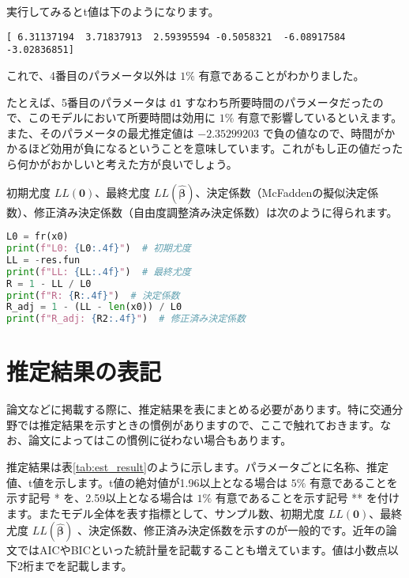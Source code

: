     実行してみるとt値は下のようになります。

    \begin{lstlisting}
[ 6.31137194  3.71837913  2.59395594 -0.5058321  -6.08917584 -3.02836851]
\end{lstlisting}

    これで、4番目のパラメータ以外は $1\%$ 有意であることがわかりました。

    たとえば、5番目のパラメータは \lstinline{d1} すなわち所要時間のパラメータだったので、このモデルにおいて所要時間は効用に $1\%$ 有意で影響しているといえます。また、そのパラメータの最尤推定値は $-2.35299203$ で負の値なので、時間がかかるほど効用が負になるということを意味しています。これがもし正の値だったら何かがおかしいと考えた方が良いでしょう。

    初期尤度 $LL(\bm 0)$、最終尤度 $LL(\bm{\hat\beta})$、決定係数（McFaddenの擬似決定係数）、修正済み決定係数（自由度調整済み決定係数）は次のように得られます。

    \begin{lstlisting}[language=Python]
L0 = fr(x0)
print(f"L0: {L0:.4f}")  # 初期尤度
LL = -res.fun
print(f"LL: {LL:.4f}")  # 最終尤度
R = 1 - LL / L0
print(f"R: {R:.4f}")  # 決定係数
R_adj = 1 - (LL - len(x0)) / L0
print(f"R_adj: {R2:.4f}")  # 修正済み決定係数
\end{lstlisting}

    \section{推定結果の表記}
    \label{sec:est_result}

    論文などに掲載する際に、推定結果を表にまとめる必要があります。特に交通分野では推定結果を示すときの慣例がありますので、ここで触れておきます。なお、論文によってはこの慣例に従わない場合もあります。

    推定結果は表\ref{tab:est_result}のように示します。パラメータごとに名称、推定値、t値を示します。t値の絶対値が1.96以上となる場合は $5\%$ 有意であることを示す記号 * を、2.59以上となる場合は $1\%$ 有意であることを示す記号 ** を付けます。またモデル全体を表す指標として、サンプル数、初期尤度 $LL(\bm 0)$、最終尤度 $LL(\bm{\hat\beta})$ 、決定係数、修正済み決定係数を示すのが一般的です。近年の論文ではAICやBICといった統計量を記載することも増えています。値は小数点以下2桁までを記載します。

